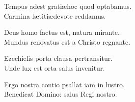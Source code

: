 

\spazio

\strofa Tempus adest grati\ae hoc quod optabamus.\\
Carmina l\ae titi\ae devote reddamus.

\spazio


\spazio

\strofa Deus homo factus est, natura mirante.\\
Mundus renovatus est a Christo regnante.

\spazio


\spazio

\strofa Ezechielis porta clausa pertransitur.\\
Unde lux est orta salus invenitur.

\spazio


\spazio

\strofa Ergo nostra contio psallat iam in lustro.\\
Benedicat Domino: salus Regi nostro.

\spazio

